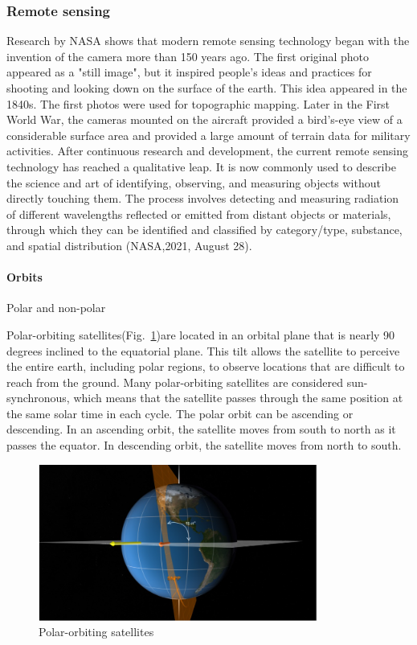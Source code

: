 \documentclass[conference]{IEEEtran}
\newcommand{\subparagraph}{}
\begin{document}
\subsubsection{Remote sensing}
Research by NASA shows that modern remote sensing technology began with the invention of the camera more than 150 years ago. The 
first original photo appeared as a "still image", but it inspired people's ideas and practices for shooting and looking down on 
the surface of the earth. This idea appeared in the 1840s. The first photos were used for topographic mapping. Later in the First 
World War, the cameras mounted on the aircraft provided a bird's-eye view of a considerable surface area and provided a large amount 
of terrain data for military activities. After continuous research and development, the current remote sensing technology has reached 
a qualitative leap. It is now commonly used to describe the science and art of identifying, observing, and measuring objects without 
directly touching them. The process involves detecting and measuring radiation of different wavelengths reflected or emitted from distant 
objects or materials, through which they can be identified and classified by category/type, substance, and spatial distribution (NASA,2021, August 28).

\paragraph{Orbits} 

\subparagraph{Polar and non-polar}

Polar-orbiting satellites(Fig.~\ref{satellites})are located in an orbital plane that is nearly 90 degrees inclined to the equatorial 
plane. This tilt allows the satellite to perceive the entire earth, including polar regions, to observe locations that are difficult 
to reach from the ground. Many polar-orbiting satellites are considered sun-synchronous, which means that the satellite passes through 
the same position at the same solar time in each cycle. The polar orbit can be ascending or descending. In an ascending orbit, the satellite 
moves from south to north as it passes the equator. In descending orbit, the satellite moves from north to south.

\begin{figure}[htbp]
    \centerline{\includegraphics[width=260pt]{images/1.1.1.png}}
    \caption{Polar-orbiting satellites}
    \label{satellites}
\end{figure}
 
\end{document}
